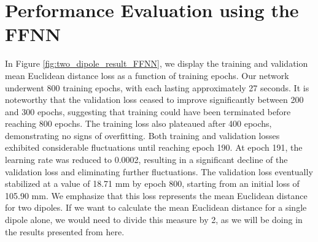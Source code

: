\documentclass[a4paper, UKenglish, 11pt]{uiomaster}
\begin{document}
\section{Performance Evaluation using the FFNN}
In Figure \ref{fig:two_dipole_result_FFNN}, we display the training and validation mean Euclidean distance loss as a function of training epochs. Our network underwent 800 training epochs, with each lasting approximately 27 seconds. It is noteworthy that the validation loss ceased to improve significantly between 200 and 300 epochs, suggesting that training could have been terminated before reaching 800 epochs. The training loss also plateaued after 400 epochs, demonstrating no signs of overfitting. Both training and validation losses exhibited considerable fluctuations until reaching epoch 190. At epoch 191, the learning rate was reduced to 0.0002, resulting in a significant decline of the validation loss and eliminating further fluctuations. The validation loss eventually stabilized at a value of 18.71 mm by epoch 800, starting from an initial loss of 105.90 mm. We emphasize that this loss represents the mean Euclidean distance for two dipoles. If we want to calculate the mean Euclidean distance for a single dipole alone, we would need to divide this measure by 2, as we will be doing in the results presented from here.



\end{document}
